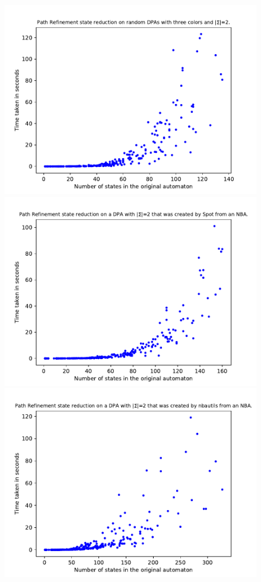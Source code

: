 \begin{figure}
	\centering
	\begin{minipage}{0.49\textwidth}
		\includegraphics[page=6,height=.3\textheight]{../data/analysis/path_refinement/gendet_ap1.pdf} 
		\includegraphics[page=6,height=.3\textheight]{../data/analysis/path_refinement/detspot_ap1.pdf} 
		\includegraphics[page=6,height=.3\textheight]{../data/analysis/path_refinement/detnbaut_ap1.pdf} 

\end{minipage}
\end{figure}
